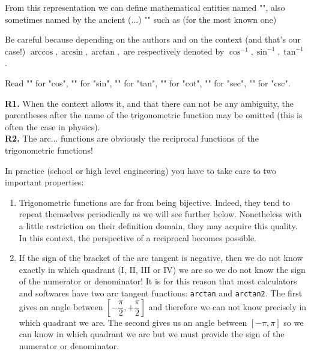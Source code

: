 From this representation we can define mathematical entities named "", also sometimes named by the ancient (...) "\label{cyclometrics functions}" such as (for the most known one)\label{definition trigonometric functions}



Be careful because depending on the authors and on the context (and that's our case!) $\arccos, \arcsin, \arctan, $ are respectively denoted by $\cos^{-1}, \sin^{-1}, \tan^{-1}$.

Read "" for "cos", "" for "sin", "" for "tan", "" for "cot", "" for "sec", "" for "csc".

	\begin{tcolorbox}[title=Remarks,colframe=black,arc=10pt]
	\textbf{R1.} When the context allows it, and that there can not be any ambiguity, the parentheses after the name of the trigonometric function may be omitted (this is often the case in physics).\\
	
	\textbf{R2.} The arc... functions are obviously the reciprocal functions of the trigonometric functions!
	\end{tcolorbox}

In practice (school or high level engineering) you have to take care to two important properties: 
	\begin{enumerate}
		\item Trigonometric functions are far from being bijective. Indeed, they tend to repeat themselves periodically as we will see further below. Nonetheless with a little restriction on their definition domain, they may acquire this quality. In this context, the perspective of a reciprocal becomes possible.
		\item If the sign of the bracket of the arc tangent is negative, then we do not know exactly in which quadrant (I, II, III or IV) we are so we do not know the sign of the numerator or denominator! It is for this reason that most calculators and softwares have two arc tangent functions: \texttt{arctan} and \texttt{arctan2}. The first gives an angle between $\left[-\dfrac{\pi}{2},+\dfrac{\pi}{2}\right]$ and therefore we can not know precisely in which quadrant we are. The second gives us an angle between $\left[-\pi,\pi\right]$ so we can know in which quadrant we are but we must provide the sign of the numerator or denominator.
	\end{enumerate}

